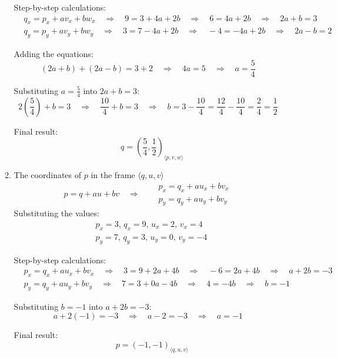 \documentclass{article}
\begin{document}
\begin{enumerate}
\begin{enumerate}
Step-by-step calculations:
\[
\begin{aligned}
    &q_x = p_x + a v_x + b w_x \quad \Rightarrow \quad 9 = 3 + 4a + 2b \quad \Rightarrow \quad 6 = 4a + 2b \quad \Rightarrow \quad 2a + b = 3 \\
    &q_y = p_y + a v_y + b w_y \quad \Rightarrow \quad 3 = 7 - 4a + 2b \quad \Rightarrow \quad -4 = -4a + 2b \quad \Rightarrow \quad 2a - b = 2
\end{aligned}
\]

Adding the equations:
\[
(2a + b) + (2a - b) = 3 + 2 \quad \Rightarrow \quad 4a = 5 \quad \Rightarrow \quad a = \frac{5}{4}
\]

Substituting $a = \frac{5}{4}$ into $2a + b = 3$:
\[
2\left(\frac{5}{4}\right) + b = 3 \quad \Rightarrow \quad \frac{10}{4} + b = 3 \quad \Rightarrow \quad b = 3 - \frac{10}{4} = \frac{12}{4} - \frac{10}{4} = \frac{2}{4} = \frac{1}{2}
\]

Final result:
\[
\quad \boxed{q = \left(\frac{5}{4}, \frac{1}{2}\right)_{\langle p, v, w \rangle}}
\]

      \item The coordinates of $p$ in the frame $\langle q, u, v\rangle$
\[
        p = q + a u + b v \quad \Rightarrow \quad 
        \begin{aligned}
            &p_x = q_x + a u_x + b v_x \\
            &p_y = q_y + a u_y + b v_y
        \end{aligned}
        \]
        Substituting the values:
\[
\begin{aligned}
    &p_x = 3, \, q_x = 9, \, u_x = 2, \, v_x = 4 \\
    &p_y = 7, \, q_y = 3, \, u_y = 0, \, v_y = -4
\end{aligned}
\]

Step-by-step calculations:
\[
\begin{aligned}
    &p_x = q_x + a u_x + b v_x \quad \Rightarrow \quad 3 = 9 + 2a + 4b \quad \Rightarrow \quad -6 = 2a + 4b \quad \Rightarrow \quad a + 2b = -3 \\
    &p_y = q_y + a u_y + b v_y \quad \Rightarrow \quad 7 = 3 + 0a - 4b \quad \Rightarrow \quad 4 = -4b \quad \Rightarrow \quad b = -1
\end{aligned}
\]

Substituting $b = -1$ into $a + 2b = -3$:
\[
a + 2(-1) = -3 \quad \Rightarrow \quad a - 2 = -3 \quad \Rightarrow \quad a = -1
\]

Final result:
\[
\quad \boxed{p = (-1, -1)_{\langle q, u, v \rangle}}
\]


\end{enumerate}
\end{enumerate}
\end{document}
